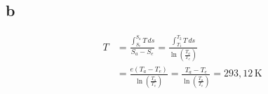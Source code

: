

\subsection*{b}

\begin{align*}
T &= \frac{\int_{S_e}^{S_a} T \, ds}{S_a - S_e} = \frac{\int_{T_1}^{T_2} T \, ds}{\ln \left( \frac{T_a}{T_e} \right)} \\
&= \frac{e \left( T_a - T_e \right)}{\ln \left( \frac{T_a}{T_e} \right)} = \frac{T_a - T_e}{\ln \left( \frac{T_a}{T_e} \right)} = 293,12 \, \text{K}
\end{align*}
